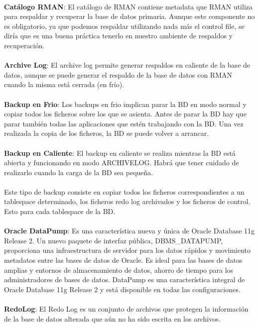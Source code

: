 \begin{enumerate}[3.1.]
\\
\textbf{Catálogo RMAN}: El catálogo de RMAN contiene metadata que RMAN utiliza para respaldar y recuperar la base de datos primaria. Aunque este componente no es obligatorio, ya que podemos respaldar utilizando nada más el control file, se diría que es una buena práctica tenerlo en nuestro ambiente de respaldos y recuperación.
\\
\\
\textbf{Archive Log}: El archive log permite generar respaldos en caliente de la base de datos, aunque se puede generar el respaldo de la base de datos con RMAN cuando la misma está cerrada (en frío).
\\
\\
\textbf{Backup en Frio}: Los backups en frio implican parar la BD en modo normal y copiar todos los ficheros sobre los que se asienta. Antes de parar la BD hay que parar también todas las aplicaciones que estén trabajando con la BD. Una vez realizada la copia de los ficheros, la BD se puede volver a arrancar.
\\
\\
\textbf{Backup en Caliente}: El backup en caliente se realiza mientras la BD está abierta y funcionando en modo ARCHIVELOG. Habrá que tener cuidado de realizarlo cuando la carga de la BD sea pequeña.
\\
\\Este tipo de backup consiste en copiar todos los ficheros correspondientes a un tablespace determinado, los ficheros redo log archivados y los ficheros de control. Esto para cada tablespace de la BD.
\\
\\
\textbf{Oracle DataPump}: Es una característica nueva y única de Oracle Database 11g Release 2. Un nuevo paquete de interfaz pública, DBMS\_DATAPUMP, proporciona una infraestructura de servidor para los datos rápidos y movimiento metadatos entre las bases de datos de Oracle. Es ideal para las bases de datos amplias y entornos de almacenamiento de datos, ahorro de tiempo para los administradores de bases de datos. DataPump es una característica integral de Oracle Database 11g Release 2 y está disponible en todas las configuraciones.
\\
\\
\textbf{RedoLog}: El Redo Log es un conjunto de archivos que protegen la información de la base de datos alterada que aún no ha sido escrita en los archivos.

\end{enumerate} 
